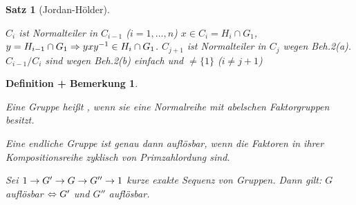 \documentclass[a4paper,10pt,german]{scrbook}
\theoremstyle{saetze}
\newtheorem{Satz}{Satz}
\theoremstyle{definitionen}
\newtheorem{DefBem}[Def]{Definition + Bemerkung}
\begin{document}
\begin{Satz}[Jordan-Hölder]
{\begin{description}
\newline $C_i$ ist Normalteiler in $C_{i-1}$ ($i=1,\dots,n$)
\newline$x \in C_i = H_i \cap G_1$, $y = H_{i-1} \cap G_1 \Rightarrow yxy^{-1} \in H_i \cap
G_1$.
\newline $C_{j+1}$ ist Normalteiler in $C_j$ wegen Beh.2(a).
\newline $C_{i-1}/C_i$ sind wegen Beh.2(b) einfach und $\neq \{1\}$
($i\neq j+1$) \end{description}} 
\end{Satz}

\begin{DefBem}
\mbox{}
\begin{enum}
\item Eine Gruppe heißt , wenn sie eine Normalreihe
mit abelschen Faktorgruppen besitzt.
\item Eine endliche Gruppe ist genau dann auflösbar, wenn die
Faktoren in ihrer Kompositionsreihe zyklisch von Primzahlordung
sind.
\item Sei $1 \rightarrow G' \rightarrow G \rightarrow G'' \rightarrow 1$ kurze exakte Sequenz von Gruppen.
Dann gilt: \newline$G$ auflösbar $\Leftrightarrow G'$ und $G''$ auflösbar.
\end{enum}
\end{DefBem}
\end{document}
